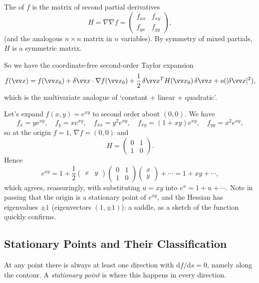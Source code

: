 \begin{definition}
	The  of $f$ is the matrix of second partial derivatives
	$$
	H = \nabla \nabla f = \begin{pmatrix} f_{xx} & f_{xy} \\ f_{yx} & f_{yy} \end{pmatrix},
	$$
	(and the analogous $n \times n$ matrix in $n$ variables). By symmetry of mixed partials, $H$ is a symmetric matrix.
\end{definition}

So we have the coordinate-free second-order Taylor expansion
$$
f(\vv x) = f(\vv x_0) + \delta \vv x \cdot \nabla f(\vv x_0) + \frac{1}{2} \, \delta \vv x^T H(\vv x_0) \, \delta \vv x + o(|\delta \vv x|^2),
$$
which is the multivariate analogue of `constant + linear + quadratic'.

\begin{example}
	Let's expand $f(x, y) = e^{xy}$ to second order about $(0, 0)$. We have
	$$
	f_x = y e^{xy}, \quad f_y = x e^{xy}, \quad f_{xx} = y^2 e^{xy}, \quad f_{xy} = (1 + xy)e^{xy}, \quad f_{yy} = x^2 e^{xy},
	$$
	so at the origin $f = 1$, $\nabla f = (0, 0)$ and
	$$
	H = \begin{pmatrix} 0 & 1 \\ 1 & 0 \end{pmatrix}.
	$$
	Hence
	$$
	e^{xy} = 1 + \frac{1}{2}\begin{pmatrix} x & y \end{pmatrix}\begin{pmatrix} 0 & 1 \\ 1 & 0\end{pmatrix}\begin{pmatrix} x \\ y \end{pmatrix} + \cdots = 1 + xy + \cdots,
	$$
	which agrees, reassuringly, with substituting $u = xy$ into $e^u = 1 + u + \cdots$. Note in passing that the origin is a stationary point of $e^{xy}$, and the Hessian has eigenvalues $\pm 1$ (eigenvectors $(1, \pm 1)$): a saddle, as a sketch of the function quickly confirms.
\end{example}

\subsection{Stationary Points and Their Classification}

At any point there is always at least one direction with $\mathrm{d}f/\mathrm{d}s = 0$, namely along the contour. A \emph{stationary point} is where this happens in every direction.

